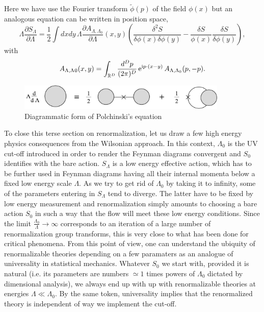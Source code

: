 \documentclass[12pt,here,feynmf]{article}
\begin{document}
Here we have use the Fourier transform $\widetilde{\phi}(p)$ of the field $\phi(x)$ but an analogous equation can be written in position space,
\begin{equation}
\Lambda\frac{\partial
S_{\Lambda}}{\partial\Lambda}=\frac{1}{2}\int\!dxdy\,
\Lambda\frac{\partial
A_{\Lambda,\Lambda_{0}}}{\partial\Lambda}(x,y)
\left(
\frac{\delta^{2}S}{\delta\phi(x)\delta\phi(y)}- 
\frac{\delta S}{\phi(x)}\frac{\delta S}{\delta\phi(y)}\right),
\end{equation}
with 
\begin{equation}
A_{\Lambda,\Lambda_{}0}(x,y)=\int_{{\Bbb R}^{D}}\frac{d^{D}p}{(2\pi)^{D}}\,
\mathrm{e}^{\mathrm{i}p\cdot(x-y)}\,A_{\Lambda,\Lambda_{0}}(p,-p).
\end{equation}


\begin{figure}
\begin{center}
\includegraphics[width=10cm]{_polch.pdf}
\caption{Diagrammatic form of Polchinski's equation}
\label{Polchinskidiag}
\end{center}
\end{figure}

To close this terse section on renormalization, let us draw a few high energy physics consequences from the Wilsonian approach. In this context, $\Lambda_{0}$ is the UV cut-off introduced in order to render the Feynman diagrams convergent and $S_{0}$ identifies with the bare action. $S_{\Lambda}$ is a low energy effective action, which has to be further used in Feynman diagrams having all their internal momenta below a fixed low energy scale $\Lambda$. As we try to get rid of $\Lambda_{0}$ by taking it to infinity, some of the parameters entering in $S_{\Lambda}$ tend to diverge. The latter have to be fixed by low energy measurement and renormalization simply amounts to choosing a bare action $S_{0}$ in such a way that the flow will meet these low energy conditions. Since the limit $\frac{\Lambda_{0}}{\Lambda}\rightarrow\infty$ corresponds to an iteration of a large number of renormalization group transforms, this is very close to what has been done for critical phenomena. From this point of view, one can understand the ubiquity of renormalizable theories depending on a few paramaters as an analogue of universality in statistical mechanics. Whatever $S_{0}$ we start with, provided it is natural (i.e. its parameters are numbers $\simeq 1$ times powers of $\Lambda_{0}$ dictated by dimensional analysis), we always end up with up with renormalizable theories at energies $\Lambda\ll \Lambda_{0}$.  By the same token, universality implies that the renormalized theory is independent of way we implement the cut-off.  
\end{document}
